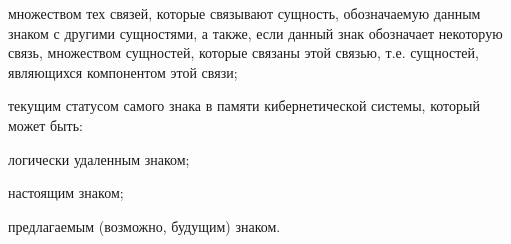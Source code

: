 \begin{SCn}
\begin{scnsubstruct}
{\begin{scnitemize}
	\item множеством тех связей, которые связывают сущность, обозначаемую данным знаком с другими сущностями, а также, если данный знак обозначает некоторую связь, множеством сущностей, которые связаны этой связью, т.е. сущностей, являющихся компонентом этой связи;
	\item текущим статусом самого знака в памяти кибернетической системы, который может быть:
		\begin{scnitemizeii}
			\item логически удаленным знаком;
			\item настоящим знаком;
			\item предлагаемым (возможно, будущим) знаком.
		\end{scnitemizeii}
	\end{scnitemize}}
	

\end{scnsubstruct}
\end{SCn}
